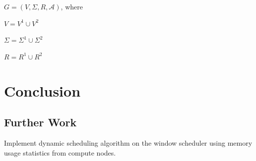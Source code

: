 \documentclass{article}
\newcommand{\tab}{\hspace*{2em}}
\begin{document}
\tab $G = (V, \Sigma , R, \mathcal{A})$, where

\tab $V = V^1\cup V^2$

\tab $\Sigma = \Sigma ^1\cup \Sigma ^2$

\tab $R = R^1\cup R^2$
\section{Conclusion}
\subsection{Further Work}
Implement dynamic scheduling algorithm on the window scheduler using memory usage statistics from compute nodes. 



\end{document}
